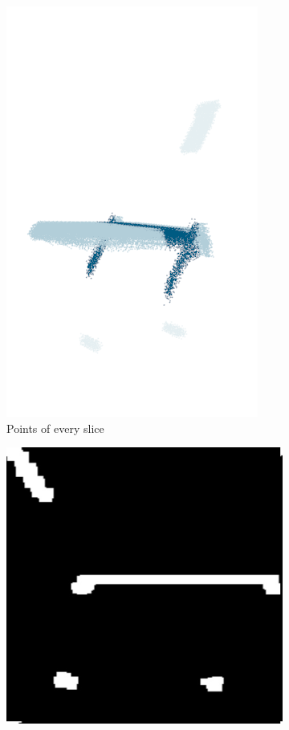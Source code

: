 \begin{figure}[!t]
\begin{subfigure}[t]{0.3\linewidth}
		\includegraphics[width=1\linewidth]{Figures/ObjRecog/slices/chairn_2}
        \caption{Points of every slice}
        \label{fig:slicing_b}
	\end{subfigure}
    \begin{subfigure}[t]{0.8\linewidth}
		\centering
        \vspace{1em}
		\includegraphics[height=0.32\linewidth]{Figures/ObjRecog/slices/chair_slice31}

\end{subfigure}
\end{figure}
